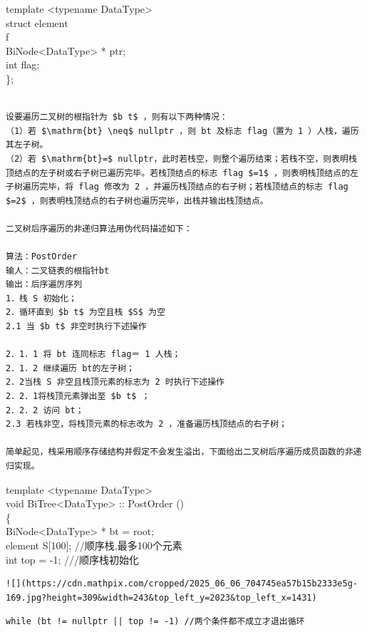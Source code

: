 \documentclass[10pt]{article}
\begin{document}
template <typename DataType>\\
struct element\\
f\\
BiNode<DataType> * ptr;\\
int flag;\\
\};

\begin{verbatim}

设要遍历二叉树的根指针为 $b t$ ，则有以下两种情况：
（1）若 $\mathrm{bt} \neq$ nullptr ，则 bt 及标志 flag（置为 1 ）人栈，遍历其左子树。
（2）若 $\mathrm{bt}=$ nullptr，此时若栈空，则整个遍历结束；若栈不空，则表明栈顶结点的左子树或右子树已遍历完毕。若栈顶结点的标志 flag $=1$ ，则表明栈顶结点的左子树遍历完毕，将 flag 修改为 2 ，并遍历栈顶结点的右子树；若栈顶结点的标志 flag $=2$ ，则表明栈顶结点的右子树也遍历完毕，出栈并输出栈顶结点。

二叉树后序遍历的非递归算法用伪代码描述如下：

算法：PostOrder
输人：二叉链表的根指针bt
输出：后序遍厉序列
1．栈 S 初始化；
2．循环直到 $b t$ 为空且栈 $S$ 为空
2.1 当 $b t$ 非空时执行下述操作

2．1．1 将 bt 连同标志 flag＝ 1 人栈；
2．1．2 继续遍历 bt的左子树；
2．2当栈 S 非空且栈顶元素的标志为 2 时执行下述操作
2．2．1将栈顶元素弹出至 $b t$ ；
2．2．2 访问 bt；
2.3 若栈非空，将栈顶元素的标志改为 2 ，准备遍历栈顶结点的右子树；

简单起见，栈采用顺序存储结构并假定不会发生溢出，下面给出二叉树后序遍历成员函数的非递归实现。
\end{verbatim}

template <typename DataType>\\
void BiTree<DataType> :: PostOrder ()\\
\{\\
BiNode<DataType> * bt = root;\\[0pt]
element S[100]; //顺序栈,最多100个元素\\
int top = -1; ///顺序栈初始化

\begin{verbatim}
![](https://cdn.mathpix.com/cropped/2025_06_06_704745ea57b15b2333e5g-169.jpg?height=309&width=243&top_left_y=2023&top_left_x=1431)
\end{verbatim}

\begin{verbatim}
while (bt != nullptr || top != -1) //两个条件都不成立才退出循环
\end{verbatim}

\begin{verbatim}

\end{verbatim}
\end{document}
